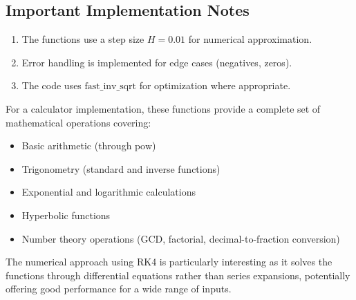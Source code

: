 \documentclass[journal]{IEEEtran}
\numberwithin{equation}{enumi}
\numberwithin{figure}{enumi}
\begin{document}
\subsection{Important Implementation Notes}
\begin{enumerate}
    \item The functions use a step size $H = 0.01$ for numerical approximation.
    \item Error handling is implemented for edge cases (negatives, zeros).
    \item The code uses $\text{fast\_inv\_sqrt}$ for optimization where appropriate.
\end{enumerate}

For a calculator implementation, these functions provide a complete set of mathematical operations covering:
\begin{itemize}
    \item Basic arithmetic (through $\text{pow}$)
    \item Trigonometry (standard and inverse functions)
    \item Exponential and logarithmic calculations
    \item Hyperbolic functions
    \item Number theory operations (GCD, factorial, decimal-to-fraction conversion)
\end{itemize}

The numerical approach using RK4 is particularly interesting as it solves the functions through differential equations rather than series expansions, potentially offering good performance for a wide range of inputs.

% 
\end{document}
